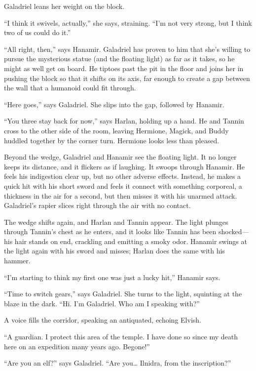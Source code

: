 \documentclass[smalldemyvopaper,11pt,twoside,onecolumn,openright,extrafontsizes]{memoir}
\begin{document}
Galadriel leans her weight on the block.

``I think it swivels, actually,'' she says, straining. ``I'm not very
strong, but I think two of us could do it.''

``All right, then,'' says Hanamir. Galadriel has proven to him that
she's willing to pursue the mysterious statue (and the floating light)
as far as it takes, so he might as well get on board. He tiptoes past
the pit in the floor and joins her in pushing the block so that it
shifts on its axis, far enough to create a gap between the wall that a
humanoid could fit through.

``Here goes,'' says Galadriel. She slips into the gap, followed by
Hanamir.

``You three stay back for now,'' says Harlan, holding up a hand. He and
Tannin cross to the other side of the room, leaving Hermione, Magick,
and Buddy huddled together by the corner turn. Hermione looks less than
pleased.

Beyond the wedge, Galadriel and Hanamir see the floating light. It no
longer keeps its distance, and it flickers as if laughing. It swoops
through Hanamir. He feels his indigestion clear up, but no other adverse
effects. Instead, he makes a quick hit with his short sword and feels it
connect with something corporeal, a thickness in the air for a second,
but then misses it with his unarmed attack. Galadriel's rapier slices
right through the air with no contact.

The wedge shifts again, and Harlan and Tannin appear. The light plunges
through Tannin's chest as he enters, and it looks like Tannin has been
shocked---his hair stands on end, crackling and emitting a smoky odor.
Hanamir swings at the light again with his sword and misses; Harlan does
the same with his hammer.

``I'm starting to think my first one was just a lucky hit,'' Hanamir
says.

``Time to switch gears,'' says Galadriel. She turns to the light,
squinting at the blaze in the dark. ``Hi. I'm Galadriel. Who am I
speaking with?''

A voice fills the corridor, speaking an antiquated, echoing Elvish.

``A guardian. I protect this area of the temple. I have done so since my
death here on an expedition many years ago. Begone!''

``Are you an elf?'' says Galadriel. ``Are you\ldots{} Ilnidra, from the
inscription?''
\end{document}
